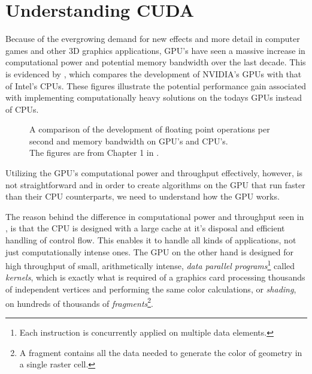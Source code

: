 \chapter{Understanding CUDA}\label{chp:GPGPU}




Because of the evergrowing demand for new effects and more detail in
computer games and other 3D graphics applications, GPU's have seen a
massive increase in computational power and potential memory bandwidth
over the last decade. This is evidenced by ,
which compares the development of NVIDIA's GPUs with that of Intel's
CPUs. These figures illustrate the potential performance gain
associated with implementing computationally heavy solutions on the
todays GPUs instead of CPUs.

\begin{figure}
  \centering 

  
  \caption[Comparison of FLOPS and throughput on GPU's and CPU's.]{A
    comparison of the development of floating point operations per
    second and memory bandwidth on GPU's and CPU's. \\The figures are
    from Chapter 1 in .}\label{fig:gpuCpuCompare}
\end{figure}


Utilizing the GPU's computational power and throughput effectively,
however, is not straightforward and in order to create algorithms on
the GPU that run faster than their CPU counterparts, we need to
understand how the GPU works.

The reason behind the difference in computational power and throughput
seen in , is that the CPU is designed with a
large cache at it's disposal and efficient handling of control
flow. This enables it to handle all kinds of applications, not just
computationally intense ones. The GPU on the other hand is designed
for high throughput of small, arithmetically intense,
\textit{data parallel programs}\footnote{Each instruction is
  concurrently applied on multiple data elements.} called
\textit{kernels}, which is exactly what is required of a graphics card
processing thousands of independent vertices and performing the same
color calculations, or \textit{shading}, on hundreds of thousands of
\textit{fragments}\footnote{A fragment contains all the data needed to
  generate the color of geometry in a single raster cell.}.

